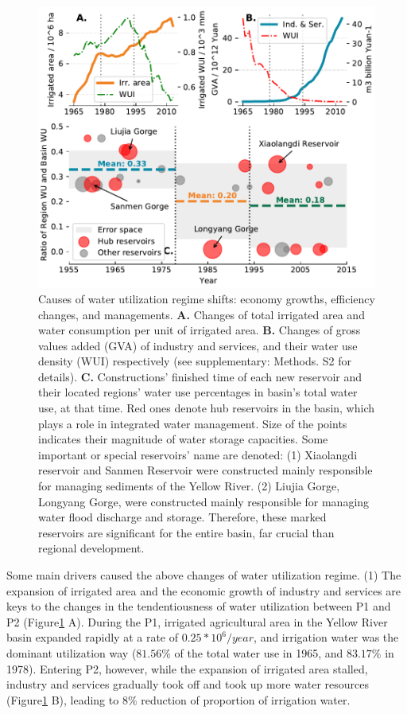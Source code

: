 \documentclass[9pt, twocolumn, twoside, lineno]{pnas-new}
\begin{document}
\begin{figure}%
	\centering
	\includegraphics[width=\linewidth]{../../figures/main/causes.pdf}
	\caption{
		Causes of water utilization regime shifts: economy growths, efficiency changes, and managements.
		\textbf{A.} Changes of total irrigated area and water consumption per unit of irrigated area.
		\textbf{B.} Changes of gross values added (GVA) of industry and services, and their water use density (WUI) respectively (see supplementary: Methods. S2 for details).
		\textbf{C.} Constructions' finished time of each new reservoir and their located regions' water use percentages in basin's total water use, at that time. Red ones denote hub reservoirs in the basin, which plays a role in integrated water management. Size of the points indicates their magnitude of water storage capacities. Some important or special reservoirs' name are denoted: (1) Xiaolangdi reservoir and Sanmen Reservoir were constructed mainly responsible for managing sediments of the Yellow River. (2) Liujia Gorge, Longyang Gorge, were constructed mainly responsible for managing water flood discharge and storage. Therefore, these marked reservoirs are significant for the entire basin, far crucial than regional development.
	}
	\label{fig:Causes}
\end{figure}

Some main drivers caused the above changes of water utilization regime.
(1) The expansion of irrigated area and the economic growth of industry and services are keys to the changes in the tendentiousness of water utilization between P1 and P2 (Figure\ref{fig:Causes} A). During the P1, irrigated agricultural area in the Yellow River basin expanded rapidly at a rate of $0.25*10^6/year$, and irrigation water was the dominant utilization way ($81.56\%$ of the total water use in 1965, and $83.17\%$ in 1978). Entering P2, however, while the expansion of irrigated area stalled, industry and services gradually took off and took up more water resources (Figure\ref{fig:Causes} B), leading to $8\%$ reduction of proportion of irrigation water.
\end{document}
